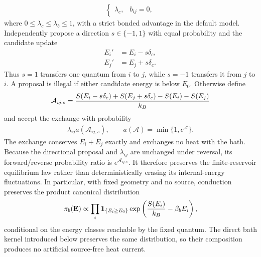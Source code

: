\documentclass[12pt,letterpaper]{article}
\newcommand{\mb}{\mathbf}
\newcommand{\mc}{\mathcal}
\begin{document}
\begin{itemize}
\begin{align*}
\begin{cases}
\lambda_{c}, &b_{ij}=0,
\end{cases}
\end{align*}
where $0 \leq \lambda_{c}\leq\lambda_{b}\leq 1$, with a strict bonded advantage in the default model. Independently propose a direction $s\in\{-1,1\}$ with equal probability and the candidate update
\begin{align*}
E_{i}' &= E_{i}-s\delta_{c}, \\
E_{j}' &= E_{j}+s\delta_{c}.
\end{align*}
Thus $s=1$ transfers one quantum from $i$ to $j$, while $s=-1$ transfers it from $j$ to $i$. A proposal is illegal if either candidate energy is below $E_{0}$. Otherwise define
\begin{align*}
\mc{A}_{ij,s}={S(E_{i}-s\delta_{c})+S(E_{j}+s\delta_{c})-S(E_{i})-S(E_{j})\over k_{B}}
\end{align*}
and accept the exchange with probability
\begin{align*}
\lambda_{ij}a(\mc{A}_{ij,s}), \qquad a(\mc{A})=\min\{1,e^{\mc{A}}\}.
\end{align*}
The exchange conserves $E_{i}+E_{j}$ exactly and exchanges no heat with the bath. Because the directional proposal and $\lambda_{ij}$ are unchanged under reversal, its forward/reverse probability ratio is $e^{\mc{A}_{ij,s}}$. It therefore preserves the finite-reservoir equilibrium law rather than deterministically erasing its internal-energy fluctuations. In particular, with fixed geometry and no source, conduction preserves the product canonical distribution
\begin{align*}
\pi_{b}(\mb{E}) \propto \prod_{i}\mb{1}_{\{E_{i}\geq E_{0}\}}
\exp\left({S(E_{i})\over k_{B}}-\beta_{b}E_{i}\right),
\end{align*}
conditional on the energy classes reachable by the fixed quantum. The direct bath kernel introduced below preserves the same distribution, so their composition produces no artificial source-free heat current.


\end{itemize}
\end{document}
